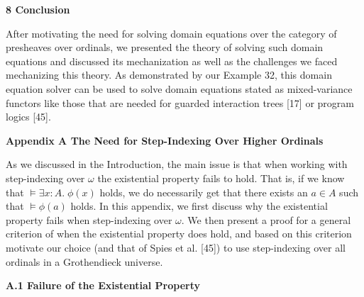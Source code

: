  


 
\par\medskip\noindent\textbf{8 Conclusion}\par
 
 
After motivating the need for solving domain equations over the category of presheaves over ordinals, we presented the theory of solving such domain equations and discussed its mechanization as well as the challenges we faced mechanizing this theory. As demonstrated by our Example 32, this domain equation solver can be used to solve domain equations stated as mixed-variance functors like those that are needed for guarded interaction trees [17] or program logics [45].\par
 
 


 
\par\medskip\noindent\textbf{Appendix A The Need for Step-Indexing Over Higher Ordinals}\par
 
 
As we discussed in the Introduction, the main issue is that when working with step-indexing over $\omega$ the existential property fails to hold. That is, if we know that $\models\exists x:A.\;\phi(x)$ holds, we do necessarily get that there exists an $a\in A$ such that $\models\phi(a)$ holds. In this appendix, we first discuss why the existential property fails when step-indexing over $\omega$. We then present a proof for a general criterion of when the existential property does hold, and based on this criterion motivate our choice (and that of Spies et al. [45]) to use step-indexing over all ordinals in a Grothendieck universe.\par
 
 
 
\par\medskip\noindent\textbf{A.1 Failure of the Existential Property}\par
 
 
